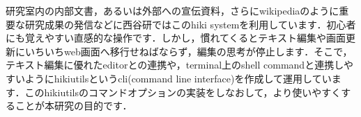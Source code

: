 研究室内の内部文書，あるいは外部への宣伝資料，さらにwikipediaのように重要な研究成果の発信などに西谷研ではこのhiki systemを利用しています．初心者にも覚えやすい直感的な操作です．しかし，慣れてくるとテキスト編集や画面更新にいちいちweb画面へ移行せねばならず，編集の思考が停止します．そこで，テキスト編集に優れたeditorとの連携や，terminal上のshell commandと連携しやすいようにhikiutilsというcli(command line interface)を作成して運用しています．このhikiutilsのコマンドオプションの実装をしなおして，より使いやすくすることが本研究の目的です．

